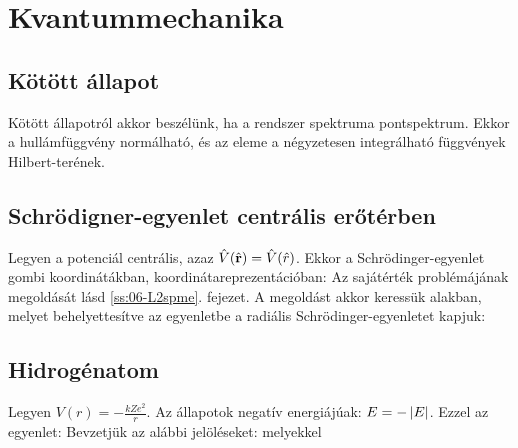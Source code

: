     
 \section{Kvantummechanika}
  
  \subsection{Kötött állapot} 
   
   Kötött állapotról akkor beszélünk, ha a rendszer spektruma pontspektrum. Ekkor a hullámfüggvény normálható, és az eleme a négyzetesen integrálható függvények Hilbert-terének.
   
  \subsection{Schrödigner-egyenlet centrális erőtérben}
   
   Legyen a potenciál centrális, azaz $\hat{V}(\hat{\mathbf{r}})=\hat{V}(\hat{r})$. Ekkor a Schrödinger-egyenlet gombi koordinátákban, koordinátareprezentációban:
   Az 
   sajátérték problémájának megoldását lásd \ref{ss:06-L2spme}. fejezet. A megoldást akkor keressük
   alakban, melyet behelyettesítve az egyenletbe a radiális Schrödinger-egyenletet kapjuk:
   
  \subsection{Hidrogénatom}
   
   Legyen $V(r)=-\frac{kZe^2}{r}$. Az állapotok negatív energiájúak: $E=-\left\lvert E\right\rvert$. Ezzel az egyenlet:
   Bevzetjük az alábbi jelöléseket:
   melyekkel
   
